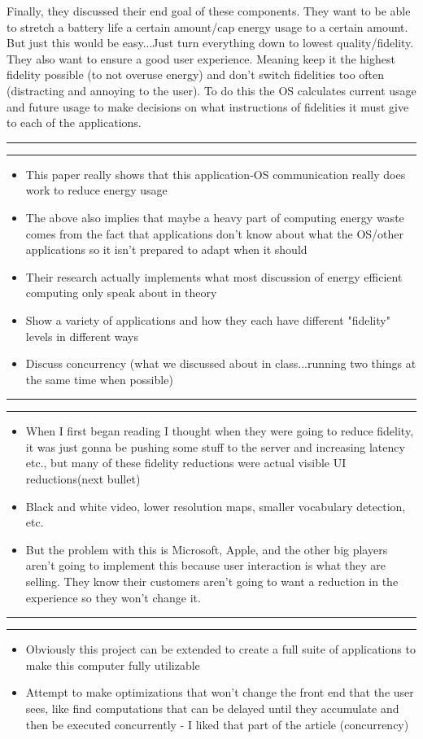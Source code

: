 \documentclass[11pt]{article}
\newcommand{\question}[2] {\vspace{.25in} \hrule\vspace{0.5em}
	\noindent{\bf #1: #2} \vspace{0.5em}
	\hrule \vspace{.10in}}
\begin{document}
	\quad Finally, they discussed their end goal of these components. They want to be able to stretch a battery life a certain amount/cap energy usage to a certain amount. But just this would be easy...Just turn everything down to lowest quality/fidelity. They also want to ensure a good user experience. Meaning keep it the highest fidelity possible (to not overuse energy) and don't switch fidelities too often (distracting and annoying to the user). To do this the OS calculates current usage and future usage to make decisions on what instructions of fidelities it must give to each of the applications.
	
	\question{2}{Strengths}
	\begin{itemize}
		\item This paper really shows that this application-OS communication really does work to reduce energy usage
		\item The above also implies that maybe a heavy part of computing energy waste comes from the fact that applications don't know about what the OS/other applications so it isn't prepared to adapt when it should
		\item Their research actually implements what most discussion of energy efficient computing only speak about in theory
		\item Show a variety of applications and how they each have different "fidelity" levels in different ways
		\item Discuss concurrency (what we discussed about in class...running two things at the same time when possible)
	\end{itemize}
	\question{3}{Weaknesses}
	\begin{itemize}
		\item When I first began reading I thought when they were going to reduce fidelity, it was just gonna be pushing some stuff to the server and increasing latency etc., but many of these fidelity reductions were actual visible UI reductions(next bullet)
		\item Black and white video, lower resolution maps, smaller vocabulary detection, etc.
		\item But the problem with this is Microsoft, Apple, and the other big players aren't going to implement this because user interaction is what they are selling. They know their customers aren't going to want a reduction in the experience so they won't change it.
	\end{itemize}
	\question{4}{Future Directions}
	\begin{itemize}
		\item Obviously this project can be extended to create a full suite of applications to make this computer fully utilizable
		\item Attempt to make optimizations that won't change the front end that the user sees, like find computations that can be delayed until they accumulate and then be executed concurrently - I liked that part of the article (concurrency)
	\end{itemize}
\end{document}
